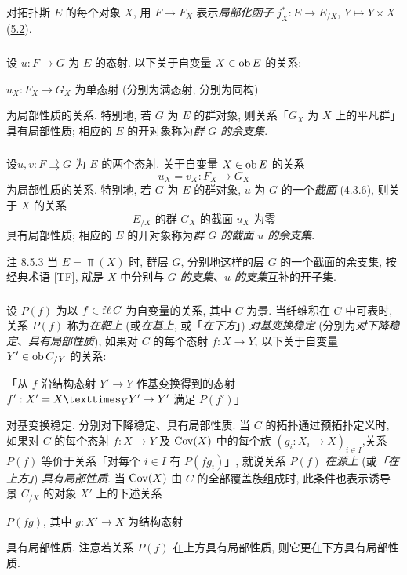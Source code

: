 对拓扑斯 $E$ 的每个对象 $X$, 用 $F\rightarrow F_X$ 表示\emph{局部化函子} $j_X^{\ast}:E\rightarrow E_{/X}$, $Y\mapsto Y\times X$ (\hyperref[IV.subsec5.2]{5.2}).

\subsubsection{}
设 $u:F\rightarrow G$ 为 $E$ 的态射. 以下关于自变量 $X\in\operatorname{ob} E$ 的关系:

$u_X:F_X\rightarrow G_X$ 为单态射 (分别为满态射, 分别为同构)

\noindent 为局部性质的关系. 特别地, 若 $G$ 为 $E$ 的群对象, 则关系「$G_X$ 为 $X$ 上的平凡群」具有局部性质; 相应的 $E$ 的开对象称为\emph{群 $G$ 的余支集}.

\subsubsection{}
设\pageoriginale $u,v:F\rightrightarrows G$ 为 $E$ 的两个态射. 关于自变量 $X\in\operatorname{ob} E$ 的关系
$$
u_X=v_X:F_X\longrightarrow G_X
$$
为局部性质的关系. 特别地, 若 $G$ 为 $E$ 的群对象, $u$ 为 $G$ 的一个\emph{截面} (\hyperref[IV.subsubsec4.3.6]{4.3.6}), 则关于 $X$ 的关系
$$
\mbox{$E_{/X}$ 的群 $G_X$ 的截面 $u_X$ 为零}
$$
具有局部性质; 相应的 $E$ 的开对象称为\emph{群 $G$ 的截面 $u$ 的余支集}.

\begin{enonce*}[remark]{注 8.5.3}
当 $E=\Top(X)$ 时, 群层 $G$, 分别地这样的层 $G$ 的一个截面的余支集, 按经典术语 [TF], 就是 $X$ 中分别与 \emph{$G$ 的支集}、\emph{$u$ 的支集}互补的开子集.
\end{enonce*}

\setcounter{subsubsection}{3}
\subsubsection{}
设 $P(f)$ 为以 $f\in{\rm f\ell\,}C$ 为自变量的关系, 其中 $C$ 为景. 当纤维积在 $C$ 中可表时, 关系 $P(f)$ 称为\emph{在靶上} (或\emph{在基上}, 或「\emph{在下方}」) \emph{对基变换稳定} (分别为\emph{对下降稳定}、\emph{具有局部性质}), 如果对 $C$ 的每个态射 $f:X\rightarrow Y$, 以下关于自变量 $Y'\in\operatorname{ob} C_{/Y}$ 的关系:

「从 $f$ 沿结构态射 $Y'\rightarrow Y$ 作基变换得到的态射 $f':X'=\fprod{X}{Y'}{Y}\rightarrow Y'$ 满足 $P(f')$」

对基变换稳定, 分别对下降稳定、具有局部性质. 当 $C$ 的拓扑通过预拓扑定义时, 如果对 $C$ 的每个态射 $f:X\rightarrow Y$ 及 $\operatorname{Cov}(X)$ 中的每个族 $(g_i:X_i\rightarrow X)_{i\in I}$,\pageoriginale 关系 $P(f)$ 等价于关系「对每个 $i\in I$ 有 $P(fg_i)$」, 就说关系 $P(f)$ \emph{在源上} (或\emph{「在上方」}) \emph{具有局部性质}. 当 $\operatorname{Cov}(X)$ 由 $C$ 的全部覆盖族组成时, 此条件也表示诱导景 $C_{/X}$ 的对象 $X'$ 上的下述关系
\begin{center}
$P(fg)$, 其中 $g:X'\rightarrow X$ 为结构态射
\end{center}
具有局部性质. 注意若关系 $P(f)$ 在上方具有局部性质, 则它更在下方具有局部性质.

